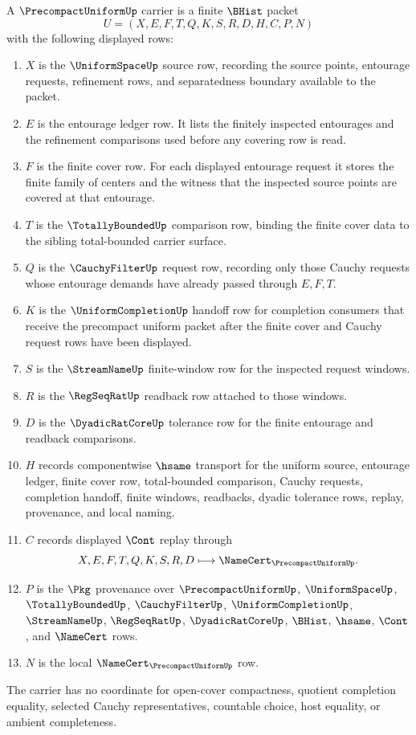 \begin{definition}
\label{def:precompact-uniform-carrier}
A $\PrecompactUniformUp$ carrier is a finite $\BHist$ packet
$$
U=(X,E,F,T,Q,K,S,R,D,H,C,P,N)
$$
with the following displayed rows:
\begin{enumerate}
\item $X$ is the $\UniformSpaceUp$ source row, recording the source points, entourage requests, refinement rows, and separatedness boundary available to the packet.
\item $E$ is the entourage ledger row. It lists the finitely inspected entourages and the refinement comparisons used before any covering row is read.
\item $F$ is the finite cover row. For each displayed entourage request it stores the finite family of centers and the witness that the inspected source points are covered at that entourage.
\item $T$ is the $\TotallyBoundedUp$ comparison row, binding the finite cover data to the sibling total-bounded carrier surface.
\item $Q$ is the $\CauchyFilterUp$ request row, recording only those Cauchy requests whose entourage demands have already passed through $E,F,T$.
\item $K$ is the $\UniformCompletionUp$ handoff row for completion consumers that receive the precompact uniform packet after the finite cover and Cauchy request rows have been displayed.
\item $S$ is the $\StreamNameUp$ finite-window row for the inspected request windows.
\item $R$ is the $\RegSeqRatUp$ readback row attached to those windows.
\item $D$ is the $\DyadicRatCoreUp$ tolerance row for the finite entourage and readback comparisons.
\item $H$ records componentwise $\hsame$ transport for the uniform source, entourage ledger, finite cover row, total-bounded comparison, Cauchy requests, completion handoff, finite windows, readbacks, dyadic tolerance rows, replay, provenance, and local naming.
\item $C$ records displayed $\Cont$ replay through
$$
X,E,F,T,Q,K,S,R,D \longmapsto \NameCert_{\PrecompactUniformUp}.
$$
\item $P$ is the $\Pkg$ provenance over $\PrecompactUniformUp$, $\UniformSpaceUp$, $\TotallyBoundedUp$, $\CauchyFilterUp$, $\UniformCompletionUp$, $\StreamNameUp$, $\RegSeqRatUp$, $\DyadicRatCoreUp$, $\BHist$, $\hsame$, $\Cont$, and $\NameCert$ rows.
\item $N$ is the local $\NameCert_{\PrecompactUniformUp}$ row.
\end{enumerate}
The carrier has no coordinate for open-cover compactness, quotient completion equality, selected Cauchy representatives, countable choice, host equality, or ambient completeness.
\end{definition}

